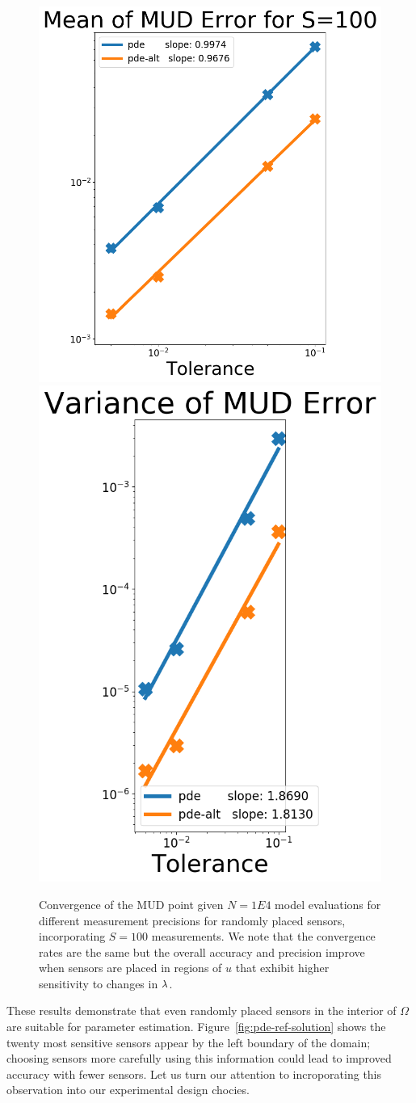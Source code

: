 \begin{figure}[htbp]
  \centering
  \includegraphics[width=0.475\linewidth]{figures/pde/pde_convergence_mud_std_mean}
  \includegraphics[width=0.475\linewidth]{figures/pde/pde_convergence_mud_std_var}
  \caption{Convergence of the MUD point given $N=1E4$ model evaluations for different measurement precisions for randomly placed sensors, incorporating $S=100$ measurements.
  We note that the convergence rates are the same but the overall accuracy and precision improve when sensors are placed in regions of $u$ that exhibit higher sensitivity to changes in $\lambda$.
  }
  \label{fig:pde-convergence-std}
\end{figure}


These results demonstrate that even randomly placed sensors in the interior of $\Omega$ are suitable for parameter estimation.
Figure~\ref{fig:pde-ref-solution} shows the twenty most sensitive sensors appear by the left boundary of the domain; choosing sensors more carefully using this information could lead to improved accuracy with fewer sensors.
Let us turn our attention to incroporating this observation into our experimental design chocies.

